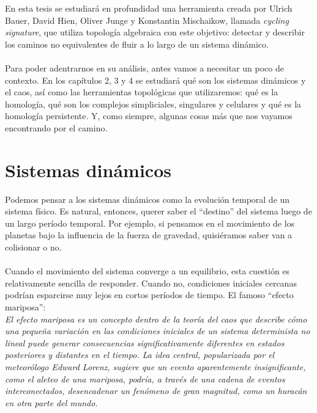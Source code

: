 \documentclass[12pt,a4paper]{article}
\begin{document}
En esta tesis se estudiará en profundidad una herramienta creada por Ulrich Bauer, David Hien, Oliver Junge y Konstantin Mischaikow, llamada \textit{cycling signature}, que utiliza topología algebraica con este objetivo: detectar y describir los caminos no equivalentes de fluir a lo largo de un sistema dinámico.
\\
\\
Para poder adentrarnos en su análisis, antes vamos a necesitar un poco de contexto. En los capítulos 2, 3 y 4 se estudiará qué son los sistemas dinámicos y el caos, así como las herramientas topológicas que utilizaremos: qué es la homología, qué son los complejos simpliciales, singulares y celulares y qué es la homología persistente. Y, como siempre, algunas cosas más que nos vayamos encontrando por el camino.
\newpage
\section{Sistemas dinámicos}
Podemos pensar a los sistemas dinámicos como la evolución temporal de un sistema físico. Es natural, entonces, querer saber el ``destino'' del sistema luego de un largo período temporal. Por ejemplo, si pensamos en el movimiento de los planetas bajo la influencia de la fuerza de gravedad, quisiéramos saber van a colisionar o no.
\\
\\
Cuando el movimiento del sistema converge a un equilibrio, esta cuestión es relativamente sencilla de responder. Cuando no, condiciones iniciales cercanas podrían esparcirse muy lejos en cortos períodos de tiempo. El famoso ``efecto mariposa'':
\\

\textit{El efecto mariposa es un concepto dentro de la teoría del caos que describe cómo una pequeña variación en las condiciones iniciales de un sistema determinista no lineal puede generar consecuencias significativamente diferentes en estados posteriores y distantes en el tiempo. La idea central, popularizada por el meteorólogo Edward Lorenz, sugiere que un evento aparentemente insignificante, como el aleteo de una mariposa, podría, a través de una cadena de eventos interconectados, desencadenar un fenómeno de gran magnitud, como un huracán en otra parte del mundo.}
\\
\end{document}
